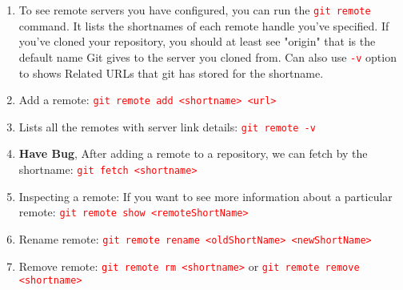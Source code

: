 \documentclass[10 pt]{article}
\newcommand{\R}{\textcolor{red}} %
\newcommand{\T}{\texttt}
\begin{document}
\begin{enumerate}
	\item To see remote servers you have configured, you can run the \R{\T{git remote}} command. It lists the shortnames of each remote handle you've specified. If you've cloned your repository, you should at least see "origin" that is the default name Git gives to the server you cloned from. Can also use \R{\T{-v}} option to shows Related URLs that git has stored for the shortname.
	\item Add a remote: \R{\T{git remote add <shortname> <url>}}
	\item Lists all the remotes with server link details: \R{\T{git remote -v}}
	\item \textbf{Have Bug}, After adding a remote to a repository, we can fetch by the shortname: \R{\T{git fetch <shortname>}}
	\item Inspecting a remote: If you want to see more information about a particular remote: \R{\T{git remote show <remoteShortName>}}
	\item Rename remote: \R{\T{git remote rename <oldShortName> <newShortName>}}
	\item Remove remote: \R{\T{git remote rm <shortname>}} or \R{\T{git remote remove <shortname>}}
\end{enumerate}
\end{document}
